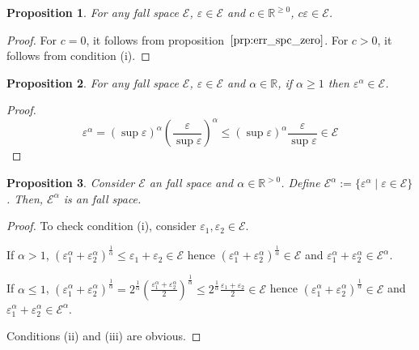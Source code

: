\documentclass{article}
\theoremstyle{definition}
\theoremstyle{plain}
\newtheorem{proposition}{Proposition}[section]
\newcommand{\Reals}{\mathbb{R}}
\begin{document}
\begin{proposition}

For any fall space $\mathcal{E}$, $\varepsilon \in \mathcal{E}$ and $c \in \Reals^{\geq 0}$, $c \varepsilon \in \mathcal{E}$.

\end{proposition}

\begin{proof}

For $c = 0$, it follows from proposition~$\ref{prp:err_spc_zero}$. For $c > 0$, it follows from condition (i).

\end{proof}

\begin{proposition}

For any fall space $\mathcal{E}$, $\varepsilon \in \mathcal{E}$ and $\alpha \in \Reals$, if $\alpha \geq 1$ then $\varepsilon^\alpha \in \mathcal{E}$.

\end{proposition}

\begin{proof}

$$\varepsilon^\alpha = (\sup \varepsilon)^\alpha (\frac{\varepsilon}{\sup \varepsilon})^\alpha \leq  (\sup \varepsilon)^\alpha \frac{\varepsilon}{\sup \varepsilon} \in \mathcal{E}$$

\end{proof}

\begin{proposition}

Consider $\mathcal{E}$ an fall space and $\alpha \in \Reals^{>0}$. Define $\mathcal{E}^\alpha := \{\varepsilon^\alpha \mid \varepsilon \in \mathcal{E}\}$. Then, $\mathcal{E}^\alpha$ is an fall space.

\end{proposition}

\begin{proof}

To check condition (i), consider $\varepsilon_1, \varepsilon_2 \in \mathcal{E}$. 

If $\alpha > 1$, $(\varepsilon_1^\alpha + \varepsilon_2^\alpha)^\frac{1}{\alpha} \leq \varepsilon_1 + \varepsilon_2 \in \mathcal{E}$ hence $(\varepsilon_1^\alpha + \varepsilon_2^\alpha)^\frac{1}{\alpha} \in \mathcal{E}$ and $\varepsilon_1^\alpha + \varepsilon_2^\alpha \in \mathcal{E}^\alpha$.

If $\alpha \leq 1$, $(\varepsilon_1^\alpha + \varepsilon_2^\alpha)^\frac{1}{\alpha} = 2^\frac{1}{\alpha}(\frac{\varepsilon_1^\alpha + \varepsilon_2^\alpha}{2})^\frac{1}{\alpha} \leq 2^\frac{1}{\alpha} \frac{\varepsilon_1+\varepsilon_2}{2} \in \mathcal{E}$ hence $(\varepsilon_1^\alpha + \varepsilon_2^\alpha)^\frac{1}{\alpha} \in \mathcal{E}$ and $\varepsilon_1^\alpha + \varepsilon_2^\alpha \in \mathcal{E}^\alpha$.

Conditions (ii) and (iii) are obvious.

\end{proof}
\end{document}

